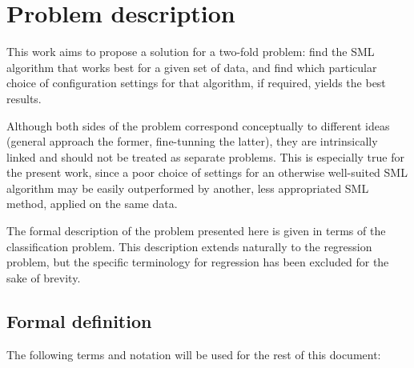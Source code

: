 \chapter{Problem description}

	This work aims to propose a solution for a two-fold problem: find the SML algorithm that works
	best for a given set of data, and find which particular choice of configuration settings for
	that algorithm, if required, yields the best results.
	
	Although both sides of the problem correspond conceptually to different ideas (general approach
	the former, fine-tunning the latter), they are intrinsically linked and should not be treated as
	separate problems. This is especially true for the present work, since a poor choice of
	settings for an otherwise well-suited SML algorithm may be easily outperformed by another, less
	appropriated SML method, applied on the same data.

	The formal description of the problem presented here is given in terms of the classification
	problem. This description extends naturally to the regression problem, but the specific
	terminology for regression has been excluded for the sake of brevity.

	\section{Formal definition}

	The following terms and notation will be used for the rest of this document:

